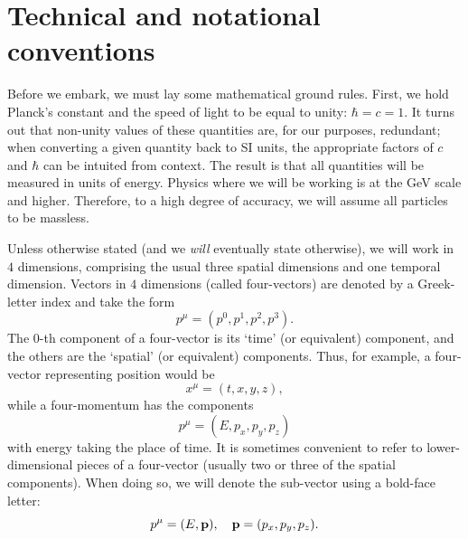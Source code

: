 \documentclass[../thesis.tex]{subfiles}
\begin{document}
\section{Technical and notational conventions}
	Before we embark, we must lay some mathematical ground rules. First, we hold Planck's constant and the speed of light to be equal to unity: $\hbar = c = 1$. It turns out that non-unity values of these quantities are, for our purposes, redundant; when converting a given quantity back to SI units, the appropriate factors of $c$ and $\hbar$ can be intuited from context. The result is that all quantities will be measured in units of energy. Physics where we will be working is at the \si{\giga\electronvolt} scale and higher. Therefore, to a high degree of accuracy, we will assume all particles to be massless.

	Unless otherwise stated (and we \textit{will} eventually state otherwise), we will work in $4$ dimensions, comprising the usual three spatial dimensions and one temporal dimension. Vectors in $4$ dimensions (called four-vectors) are denoted by a Greek-letter index and take the form
	\begin{equation}
		p^\mu = (p^0, p^1, p^2, p^3).
	\end{equation}
	The $0$-th component of a four-vector is its `time' (or equivalent) component, and the others are the `spatial' (or equivalent) components. Thus, for example, a four-vector representing position would be
	\begin{equation}
		x^\mu = (t, x, y, z),
	\end{equation}
	while a four-momentum has the components
	\begin{equation}
		p^\mu = (E, p_x, p_y, p_z)
	\end{equation}
	with energy taking the place of time. It is sometimes convenient to refer to lower-dimensional pieces of a four-vector (usually two or three of the spatial components). When doing so, we will denote the sub-vector using a bold-face letter:
	\begin{equation}
		p^\mu = (E, \vb{p}), \quad \vb{p} = (p_x, p_y, p_z).
	\end{equation}
\end{document}
